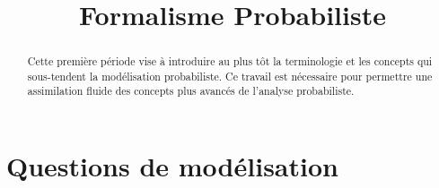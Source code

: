\documentclass[11pt, a4paper]{article}
\title{%
  { \huge Formalisme Probabiliste}%
}
\author{}
\date{}
\begin{document}
\maketitle\thispagestyle{fancy}

\begin{abstract}
  Cette première période vise à introduire au plus tôt la terminologie
  et les concepts qui sous-tendent la modélisation probabiliste. Ce
  travail est nécessaire pour permettre une assimilation fluide des
  concepts plus avancés de l'analyse probabiliste.
\end{abstract}

\tableofcontents

\section{Questions de modélisation}
\label{sec:questionsModelisation}
\end{document}
